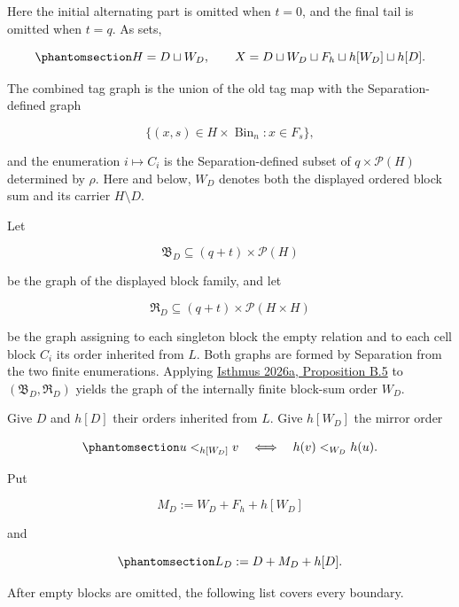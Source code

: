 \documentclass[
  english,
  11pt,
  reqno]{amsart}
\begin{document}
Here the initial alternating part is omitted when \(t=0\), and the final
tail is omitted when \(t=q\). As sets,

\begin{equation}\protect\phantomsection\label{eq:typefree-localized-carrier-partition}{
H=D\sqcup W_D,
\qquad
X=D\sqcup W_D\sqcup F_h\sqcup h[W_D]\sqcup h[D].
}\end{equation}

The combined tag graph is the union of the old tag map with the
Separation-defined graph

\[
\{(x,s)\in H\times\operatorname{Bin}_n:x\in F_s\},
\]

and the enumeration \(i\mapsto C_i\) is the Separation-defined subset of
\(q\times\mathcal P(H)\) determined by \(\rho\). Here and below, \(W_D\)
denotes both the displayed ordered block sum and its carrier
\(H\setminus D\).

Let

\[
\mathfrak B_D\subseteq(q+t)\times\mathcal P(H)
\]

be the graph of the displayed block family, and let

\[
\mathfrak R_D\subseteq(q+t)\times\mathcal P(H\times H)
\]

be the graph assigning to each singleton block the empty relation and to
each cell block \(C_i\) its order inherited from \(L\). Both graphs are
formed by Separation from the two finite enumerations. Applying
\hyperref[ref:isthmus2026a]{Isthmus 2026a, Proposition B.5} to
\((\mathfrak B_D,\mathfrak R_D)\) yields the graph of the internally
finite block-sum order \(W_D\).

Give \(D\) and \(h[D]\) their orders inherited from \(L\). Give
\(h[W_D]\) the mirror order

\begin{equation}\protect\phantomsection\label{eq:typefree-mirror-order}{
u<_{h[W_D]}v
\quad\Longleftrightarrow\quad
h(v)<_{W_D}h(u).
}\end{equation}

Put

\[
M_D:=W_D+F_h+h[W_D]
\]

and

\begin{equation}\protect\phantomsection\label{eq:typefree-localized-order}{
L_D:=D+M_D+h[D].
}\end{equation}

After empty blocks are omitted, the following list covers every
boundary.
\end{document}
